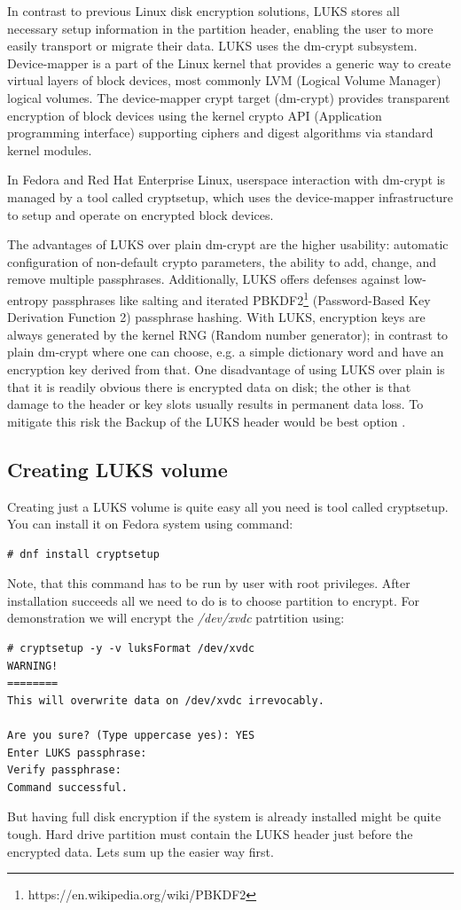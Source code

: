 In contrast to previous Linux disk encryption solutions, LUKS stores all necessary setup information in the partition header, enabling the user to more easily transport or migrate their data.
LUKS uses the dm-crypt subsystem.
Device-mapper is a part of the Linux kernel that provides a generic way to create virtual layers of block devices, most commonly LVM (Logical Volume Manager) logical volumes.
The device-mapper crypt target (dm-crypt) provides transparent encryption of block devices using the kernel crypto API (Application programming interface) supporting ciphers and digest algorithms via standard kernel modules.

In Fedora and Red Hat Enterprise Linux, userspace interaction with dm-crypt is managed by a tool called cryptsetup, which uses the device-mapper infrastructure to setup and operate on encrypted block devices.

The advantages of LUKS over plain dm-crypt are the higher usability: automatic configuration of non-default crypto parameters, the ability to add, change, and remove multiple passphrases.
Additionally, LUKS offers defenses against low-entropy passphrases like salting and iterated PBKDF2\footnote{https://en.wikipedia.org/wiki/PBKDF2} (Password-Based Key Derivation Function 2) passphrase hashing.
With LUKS, encryption keys are always generated by the kernel RNG (Random number generator); in contrast to plain dm-crypt where one can choose, e.g. a simple dictionary word and have an encryption key derived from that.
One disadvantage of using LUKS over plain is that it is readily obvious there is encrypted data on disk; the other is that damage to the header or key slots usually results in permanent data loss.
To mitigate this risk the Backup of the LUKS header would be best option \cite{fruhwirth2005luks}.

\subsection{Creating LUKS volume}\label{createLUKS}

Creating just a LUKS volume is quite easy all you need is tool called cryptsetup.
You can install it on Fedora system using command:
\begin{lstlisting}[columns=fixed,tabsize=4,backgroundcolor=\color{yellow!10}]
# dnf install cryptsetup
\end{lstlisting}
Note, that this command has to be run by user with root privileges.
After installation succeeds all we need to do is to choose partition to encrypt.
For demonstration we will encrypt the {\it /dev/xvdc} patrtition using:
\begin{lstlisting}[columns=fixed,tabsize=4,backgroundcolor=\color{yellow!10}]
# cryptsetup -y -v luksFormat /dev/xvdc
WARNING!
========
This will overwrite data on /dev/xvdc irrevocably.

Are you sure? (Type uppercase yes): YES
Enter LUKS passphrase:
Verify passphrase:
Command successful.
\end{lstlisting}
But having full disk encryption if the system is already installed might be quite tough.
Hard drive partition must contain the LUKS header just before the encrypted data.
Lets sum up the easier way first.

